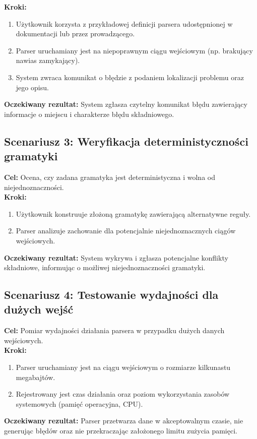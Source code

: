 \textbf{Kroki:}
\begin{enumerate}
    \item Użytkownik korzysta z przykładowej definicji parsera udostępnionej w dokumentacji lub przez prowadzącego.
    \item Parser uruchamiany jest na niepoprawnym ciągu wejściowym (np. brakujący nawias zamykający).
    \item System zwraca komunikat o błędzie z podaniem lokalizacji problemu oraz jego opisu.
\end{enumerate}

\textbf{Oczekiwany rezultat:} System zgłasza czytelny komunikat błędu zawierający informacje o miejscu i charakterze błędu składniowego.

\subsection*{Scenariusz 3: Weryfikacja deterministyczności gramatyki}

\textbf{Cel:} Ocena, czy zadana gramatyka jest deterministyczna i wolna od niejednoznaczności.\\

\textbf{Kroki:}
\begin{enumerate}
    \item Użytkownik konstruuje złożoną gramatykę zawierającą alternatywne reguły.
    \item Parser analizuje zachowanie dla potencjalnie niejednoznacznych ciągów wejściowych.
\end{enumerate}

\textbf{Oczekiwany rezultat:} System wykrywa i zgłasza potencjalne konflikty składniowe, informując o możliwej niejednoznaczności gramatyki.

\subsection*{Scenariusz 4: Testowanie wydajności dla dużych wejść}

\textbf{Cel:} Pomiar wydajności działania parsera w przypadku dużych danych wejściowych.\\

\textbf{Kroki:}
\begin{enumerate}
    \item Parser uruchamiany jest na ciągu wejściowym o rozmiarze kilkunastu megabajtów.
    \item Rejestrowany jest czas działania oraz poziom wykorzystania zasobów systemowych (pamięć operacyjna, CPU).
\end{enumerate}

\textbf{Oczekiwany rezultat:} Parser przetwarza dane w akceptowalnym czasie, nie generując błędów oraz nie przekraczając założonego limitu zużycia pamięci.

